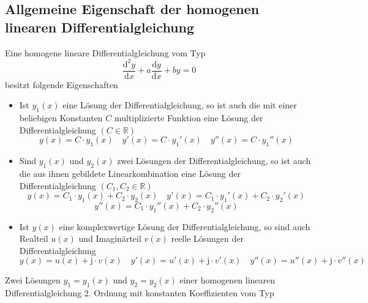 \subsection{Allgemeine Eigenschaft der homogenen linearen Differentialgleichung}
Eine homogene lineare Differentialgleichung vom Typ 
\begin{equation}
\boxed{\dfrac{\text{d}^2y}{\text{d}x}+a\dfrac{\text{d}y}{\text{d}x}+by=0}
\end{equation}
besitzt folgende Eigenschaften
\begin{itemize}
\item Ist $y_1\left(x\right)$ eine Lösung der Differentialgleichung, so ist auch die mit einer beliebigen Konstanten $C$ multiplizierte Funktion eine Lösung der Differentialgleichung $\left(C\in \mathbb{R}\right)$
\begin{equation}
\boxed{y\left(x\right)=C\cdot y_1\left(x\right)}\quad \boxed{y'\left(x\right)=C\cdot y_1'\left(x\right)}\quad \boxed{y''\left(x\right)=C\cdot y_1''\left(x\right)}
\end{equation}
\item Sind $y_1\left(x\right)$ und $y_2\left(x\right)$ zwei Lösungen der Differentialgleichung, so ist auch die aus ihnen gebildete Linearkombination eine Lösung der Differentialgleichung $\left(C_1, C_2\in \mathbb{R}\right)$
\begin{equation}
\boxed{y\left(x\right)=C_1\cdot y_1\left(x\right)+C_2\cdot y_2\left(x\right)}\quad \boxed{y'\left(x\right)=C_1\cdot y_1'\left(x\right)+C_2\cdot y_2'\left(x\right)}
\end{equation}
\begin{equation}
\boxed{y''\left(x\right)=C_1\cdot y_1''\left(x\right)+C_2\cdot y_2''\left(x\right)}
\end{equation}
\item Ist $y\left(x\right)$ eine komplexwertige Lösung der Differentialgleichung, so sind auch Realteil $u\left(x\right)$ und Imaginärteil $v\left(x\right)$ reelle Lösungen der Differentialgleichung
\begin{equation}
\boxed{y\left(x\right)=u\left(x\right)+\text{j}\cdot v\left(x\right)}\quad \boxed{y'\left(x\right)=u'\left(x\right)+\text{j}\cdot v'\left(x\right)}\quad \boxed{y''\left(x\right)=u''\left(x\right)+\text{j}\cdot v''\left(x\right)}
\end{equation}
\end{itemize}
Zwei Lösungen $y_1=y_1\left(x\right)$ und $y_2=y_2\left(x\right)$ einer homogenen linearen Differentialgleichung 2. Ordnung mit konstanten Koeffizienten vom Typ
